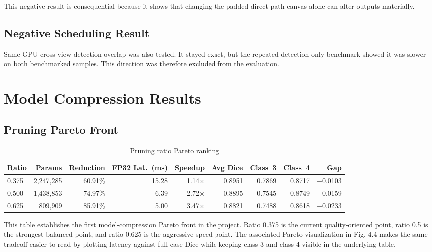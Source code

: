This negative result is consequential because it shows
that changing the padded direct-path canvas alone can alter outputs
materially.

\hypertarget{negative-scheduling-result}{%
\subsection{Negative Scheduling
Result}\label{negative-scheduling-result}}

Same-GPU cross-view detection overlap was also tested. It stayed exact,
but the repeated detection-only benchmark showed it was slower on both
benchmarked samples. This direction was therefore excluded from the evaluation.

\hypertarget{model-compression-results}{%
\section{Model Compression Results}\label{model-compression-results}}

\hypertarget{pruning-pareto-front}{%
\subsection{Pruning Pareto Front}\label{pruning-pareto-front}}

\begin{table}[H]
\centering
\caption{Pruning ratio Pareto ranking}
\label{tab:pareto}
\begin{adjustbox}{max width=\textwidth}
\renewcommand{\arraystretch}{1.15}
\begin{tabular}{l rr rr rrr r}
\toprule
\textbf{Ratio} & \textbf{Params} & \textbf{Reduction} & \textbf{FP32 Lat.\ (ms)} & \textbf{Speedup} & \textbf{Avg Dice} & \textbf{Class~3} & \textbf{Class~4} & \textbf{Gap} \\
\midrule
0.375 & 2,247,285 & 60.91\% & 15.28 & 1.14$\times$ & 0.8951 & 0.7869 & 0.8717 & $-$0.0103 \\
0.500 & 1,438,853 & 74.97\% &  6.39 & 2.72$\times$ & 0.8895 & 0.7545 & 0.8749 & $-$0.0159 \\
0.625 &   809,909 & 85.91\% &  5.00 & 3.47$\times$ & 0.8821 & 0.7488 & 0.8618 & $-$0.0233 \\
\bottomrule
\end{tabular}
\end{adjustbox}
\end{table}

This table establishes the first model-compression Pareto front in the
project. Ratio 0.375 is the current quality-oriented point,
ratio 0.5 is the strongest balanced point, and ratio
0.625 is the aggressive-speed point. The associated Pareto
visualization in Fig. 4.4 makes the same tradeoff easier to read by
plotting latency against full-case Dice while keeping class 3
and class 4 visible in the underlying table.

